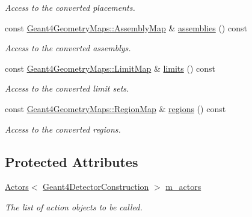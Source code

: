 \begin{DoxyCompactItemize}
\begin{DoxyCompactList}\small\item\em Access to the converted placements. \end{DoxyCompactList}\item 
const \hyperlink{namespace_d_d4hep_1_1_simulation_1_1_geant4_geometry_maps_ae1f67e315dd299b17e4ea1c58a47b312}{Geant4\+Geometry\+Maps\+::\+Assembly\+Map} \& \hyperlink{class_d_d4hep_1_1_simulation_1_1_geant4_detector_construction_sequence_a3aedc4fa1c4ac699d1b4bf0586cc8d22}{assemblies} () const
\begin{DoxyCompactList}\small\item\em Access to the converted assemblys. \end{DoxyCompactList}\item 
const \hyperlink{namespace_d_d4hep_1_1_simulation_1_1_geant4_geometry_maps_a338013d6709b82358b8e2490cdba0ed2}{Geant4\+Geometry\+Maps\+::\+Limit\+Map} \& \hyperlink{class_d_d4hep_1_1_simulation_1_1_geant4_detector_construction_sequence_a21deeed65cfa08243f036839f4597556}{limits} () const
\begin{DoxyCompactList}\small\item\em Access to the converted limit sets. \end{DoxyCompactList}\item 
const \hyperlink{namespace_d_d4hep_1_1_simulation_1_1_geant4_geometry_maps_afb7f77d7599fee831bfb2341123e8377}{Geant4\+Geometry\+Maps\+::\+Region\+Map} \& \hyperlink{class_d_d4hep_1_1_simulation_1_1_geant4_detector_construction_sequence_a1530c4fc7b3c80d7bf2d30be6e873b85}{regions} () const
\begin{DoxyCompactList}\small\item\em Access to the converted regions. \end{DoxyCompactList}\end{DoxyCompactItemize}

\subsection*{Protected Attributes}
\begin{DoxyCompactItemize}
\item 
\hyperlink{class_d_d4hep_1_1_simulation_1_1_geant4_action_1_1_actors}{Actors}$<$ \hyperlink{class_d_d4hep_1_1_simulation_1_1_geant4_detector_construction}{Geant4\+Detector\+Construction} $>$ \hyperlink{class_d_d4hep_1_1_simulation_1_1_geant4_detector_construction_sequence_aa67150ae24c47c85655faf5bd89fad28}{m\+\_\+actors}
\begin{DoxyCompactList}\small\item\em The list of action objects to be called. \end{DoxyCompactList}\end{DoxyCompactItemize}
